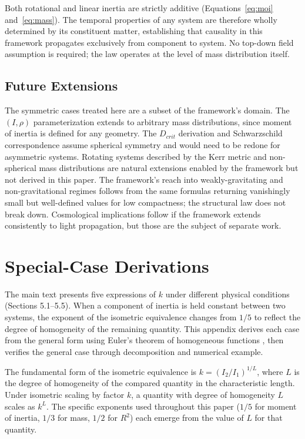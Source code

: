 \documentclass[twoside,twocolumn,9pt]{article}
\begin{document}
Both rotational and linear inertia are strictly additive (Equations~\ref{eq:moi} and~\ref{eq:mass}). The temporal properties of any system are therefore wholly determined by its constituent matter, establishing that causality in this framework propagates exclusively from component to system. No top-down field assumption is required; the law operates at the level of mass distribution itself.

\subsection{Future Extensions}

The symmetric cases treated here are a subset of the framework's domain. The $(I, \rho)$ parameterization extends to arbitrary mass distributions, since moment of inertia is defined for any geometry. The $D_{crit}$ derivation and Schwarzschild correspondence assume spherical symmetry and would need to be redone for asymmetric systems. Rotating systems described by the Kerr metric \citep{kerr1963} and non-spherical mass distributions are natural extensions enabled by the framework but not derived in this paper. The framework's reach into weakly-gravitating and non-gravitational regimes follows from the same formulas returning vanishingly small but well-defined values for low compactness; the structural law does not break down. Cosmological implications follow if the framework extends consistently to light propagation, but those are the subject of separate work.

\appendix
\renewcommand{\thesection}{Appendix~\Alph{section}}
\section{Special-Case Derivations} \label{app:general_ste}

The main text presents five expressions of $k$ under different physical conditions (Sections 5.1--5.5). When a component of inertia is held constant between two systems, the exponent of the isometric equivalence changes from $1/5$ to reflect the degree of homogeneity of the remaining quantity. This appendix derives each case from the general form using Euler's theorem of homogeneous functions \citep{widder1961}, then verifies the general case through decomposition and numerical example.

The fundamental form of the isometric equivalence is $k = (I_2/I_1)^{1/L}$, where $L$ is the degree of homogeneity of the compared quantity in the characteristic length. Under isometric scaling by factor $k$, a quantity with degree of homogeneity $L$ scales as $k^L$. The specific exponents used throughout this paper ($1/5$ for moment of inertia, $1/3$ for mass, $1/2$ for $R^2$) each emerge from the value of $L$ for that quantity.
\end{document}

